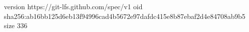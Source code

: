 version https://git-lfs.github.com/spec/v1
oid sha256:ab16bb125d6eb13f94996cad4b5672e97dafdc415e8b87ebaf2d4e84708ab9b5
size 336
